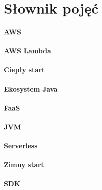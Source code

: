 \chapter*{Słownik pojęć}

\subsubsection*{AWS}

\subsubsection*{AWS Lambda}

\subsubsection*{Ciepły start}

\subsubsection*{Ekosystem Java}

\subsubsection*{FaaS}

\subsubsection*{JVM}

\subsubsection*{Serverless}

\subsubsection*{Zimny start}

\subsubsection*{SDK}

